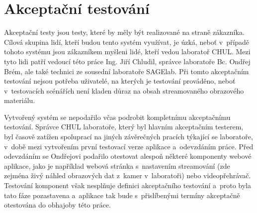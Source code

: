 \documentclass[thesis=M,czech]{FITthesis}[2012/06/26]
\begin{document}
\section{Akceptační testování} \label{sec:testovani_akceptacni}
Akceptační testy jsou testy, které by měly být realizované na straně zákazníka. Cílová skupina lidí, kteří budou tento systém využívat, je úzká, neboť v~případě tohoto systému jsou zákazníkem myšleni lidé, kteří vedou laboratoř CHUL. Mezi tyto lidi patří vedoucí této práce Ing. Jiří Chludil, správce laboratoře Bc. Ondřej Brém, ale také technici ze sousední laboratoře SAGElab. Při tomto akceptačním testování nejsou potřeba uživatelé, na kterých je testování prováděno, neboť v~testovacích scénářích není kladen důraz na obsah streamovaného obrazového materiálu. 

	Vytvořený systém se nepodařilo včas podrobit kompletnímu akceptačnímu testování. Správce CHUL laboratoře, který byl hlavním akceptačním testerem, byl časově zatížen spoluprací na jiných závěrečných pracích týkající se laboratoře, v~době mezi vytvořením první testovací verze aplikace a~odevzdáním práce. Před odevzdáním se Ondřejovi podařilo otestovat alespoň některé komponenty webové aplikace, jako je například webová stránka s~nastavením streamování (zde zejména živý náhled obrazových dat z~kamer v~laboratoři) nebo videopřehrávač. Testování komponent však nesplňuje definici akceptačního testování a~proto byla tato fáze pozastavena a~aplikace tak bude s~přislíbenými termíny akceptačně otestována do obhajoby této práce.
		
\end{document}
